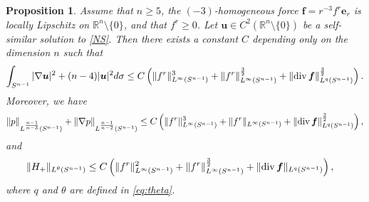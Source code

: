 \documentclass[12pt]{amsart}
\newtheorem{pro}[theorem]{Proposition}
\renewcommand{\div}{{\rm div \thinspace }}
\newcommand{\Bu}{{\boldsymbol{u}}}
\newcommand{\Be}{{\boldsymbol{e}}}
\newcommand{\Bf}{{\boldsymbol{f}}}
\begin{document}
\begin{pro}\label{pro:ngeq13}
	Assume that $n\geq 5$,  the $(-3)$-homogeneous force  $\Bf=r^{-3} f^r \Be_{r}$ is locally Lipschitz on $\mathbb{R}^n \setminus \{0\}$,  and that $f^r\geq 0$.  Let $\Bu \in C^2(\mathbb{R}^n \setminus\{0\})$ be a  self-similar solution to \eqref{NS}. Then there exists a constant $C$ depending only on the dimension $n$ such that
	\begin{equation}\label{eq:energyes2}
		\int_{S^{n-1}} |\nabla \Bu|^2 +(n-4)|\Bu|^2  d \sigma \leq 
		C \left( \|f^r\|_{L^\infty (S^{n-1})}^{3}  + \|f^r\|_{L^\infty (S^{n-1})}^{\frac32}  + \|\div \Bf\|_{L^q(S^{n-1})}^{\frac32}\right). 
	\end{equation}
	Moreover, we have
	\begin{equation}
		\begin{aligned}
			\| p\|_{L^{\frac{n-1}{n-3}}(S^{n-1})} + \|\nabla p\|_{L^{\frac{n-1}{n-2}}(S^{n-1})} 
			\leq C \left( \|f^r\|_{L^\infty (S^{n-1})}^{3}  + \|f^r\|_{L^\infty (S^{n-1})}  + \|\div \Bf\|_{L^q(S^{n-1})}^{\frac32} \right), 
		\end{aligned}
	\end{equation}
	and 
	\begin{equation}
		\begin{aligned}\label{estimateforH}
			\|H_+\|_{L^{\theta}(S^{n-1})} 
			&\leq  C \left( \|f^r\|_{L^\infty (S^{n-1})}^{2}  + \|f^r\|_{L^\infty (S^{n-1})}^{\frac32}  + \|\div \Bf\|_{L^q(S^{n-1})}\right),
		\end{aligned}
	\end{equation}  
	where $q$ and $\theta$ are defined in \eqref{eq:theta}. 
\end{pro}
\end{document}
